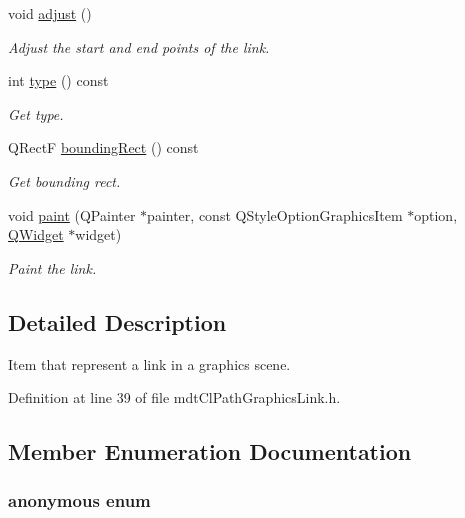 \begin{DoxyCompactItemize}
void \hyperlink{classmdt_cl_path_graphics_link_aca6ea2d8ae9944b2739865072170c812}{adjust} ()
\begin{DoxyCompactList}\small\item\em Adjust the start and end points of the link. \end{DoxyCompactList}\item 
int \hyperlink{classmdt_cl_path_graphics_link_ab2f102d6d2dcac5da1e62188f19dbfcd}{type} () const 
\begin{DoxyCompactList}\small\item\em Get type. \end{DoxyCompactList}\item 
Q\-Rect\-F \hyperlink{classmdt_cl_path_graphics_link_a282899cce5aff82c7f1ff057dfd2a7e5}{bounding\-Rect} () const 
\begin{DoxyCompactList}\small\item\em Get bounding rect. \end{DoxyCompactList}\item 
void \hyperlink{classmdt_cl_path_graphics_link_a7a50d75bff40311438d59a4ebb4302f8}{paint} (Q\-Painter $\ast$painter, const Q\-Style\-Option\-Graphics\-Item $\ast$option, \hyperlink{class_q_widget}{Q\-Widget} $\ast$widget)
\begin{DoxyCompactList}\small\item\em Paint the link. \end{DoxyCompactList}\end{DoxyCompactItemize}


\subsection{Detailed Description}
Item that represent a link in a graphics scene. 

Definition at line 39 of file mdt\-Cl\-Path\-Graphics\-Link.\-h.



\subsection{Member Enumeration Documentation}
\hypertarget{classmdt_cl_path_graphics_link_a5813cf269d04fc1ff16163504f2f4149}{\subsubsection[{anonymous enum}]{\setlength{\rightskip}{0pt plus 5cm}anonymous enum}}\label{classmdt_cl_path_graphics_link_a5813cf269d04fc1ff16163504f2f4149}


